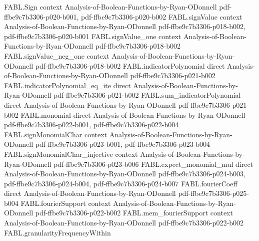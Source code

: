 \begin{theorem}
\label{FABL.fourierWeightAtLevel_majority_odd_tendsto}
\leanok
{}
\proofstep
  {FABL.Sign}
  {context}
  {Analysis-of-Boolean-Functions-by-Ryan-ODonnell}
  {pdf-ffbe9c7b3306-p020-b001,
    pdf-ffbe9c7b3306-p020-b002}
\proofstep
  {FABL.signValue}
  {context}
  {Analysis-of-Boolean-Functions-by-Ryan-ODonnell}
  {pdf-ffbe9c7b3306-p018-b002,
    pdf-ffbe9c7b3306-p020-b001}
\proofstep
  {FABL.signValue_one}
  {context}
  {Analysis-of-Boolean-Functions-by-Ryan-ODonnell}
  {pdf-ffbe9c7b3306-p018-b002}
\proofstep
  {FABL.signValue_neg_one}
  {context}
  {Analysis-of-Boolean-Functions-by-Ryan-ODonnell}
  {pdf-ffbe9c7b3306-p018-b002}
\proofstep
  {FABL.indicatorPolynomial}
  {direct}
  {Analysis-of-Boolean-Functions-by-Ryan-ODonnell}
  {pdf-ffbe9c7b3306-p021-b002}
\proofstep
  {FABL.indicatorPolynomial_eq_ite}
  {direct}
  {Analysis-of-Boolean-Functions-by-Ryan-ODonnell}
  {pdf-ffbe9c7b3306-p021-b002}
\proofstep
  {FABL.sum_indicatorPolynomial}
  {direct}
  {Analysis-of-Boolean-Functions-by-Ryan-ODonnell}
  {pdf-ffbe9c7b3306-p021-b002}
\proofstep
  {FABL.monomial}
  {direct}
  {Analysis-of-Boolean-Functions-by-Ryan-ODonnell}
  {pdf-ffbe9c7b3306-p022-b001,
    pdf-ffbe9c7b3306-p022-b004}
\proofstep
  {FABL.signMonomialChar}
  {context}
  {Analysis-of-Boolean-Functions-by-Ryan-ODonnell}
  {pdf-ffbe9c7b3306-p023-b001,
    pdf-ffbe9c7b3306-p023-b004}
\proofstep
  {FABL.signMonomialChar_injective}
  {context}
  {Analysis-of-Boolean-Functions-by-Ryan-ODonnell}
  {pdf-ffbe9c7b3306-p023-b006}
\proofstep
  {FABL.expect_monomial_mul}
  {direct}
  {Analysis-of-Boolean-Functions-by-Ryan-ODonnell}
  {pdf-ffbe9c7b3306-p024-b003,
    pdf-ffbe9c7b3306-p024-b004,
    pdf-ffbe9c7b3306-p024-b007}
\proofstep
  {FABL.fourierCoeff}
  {direct}
  {Analysis-of-Boolean-Functions-by-Ryan-ODonnell}
  {pdf-ffbe9c7b3306-p025-b004}
\proofstep
  {FABL.fourierSupport}
  {context}
  {Analysis-of-Boolean-Functions-by-Ryan-ODonnell}
  {pdf-ffbe9c7b3306-p022-b002}
\proofstep
  {FABL.mem_fourierSupport}
  {context}
  {Analysis-of-Boolean-Functions-by-Ryan-ODonnell}
  {pdf-ffbe9c7b3306-p022-b002}
\proofstep
  {FABL.granularityFrequencyWithin}

\end{theorem}
